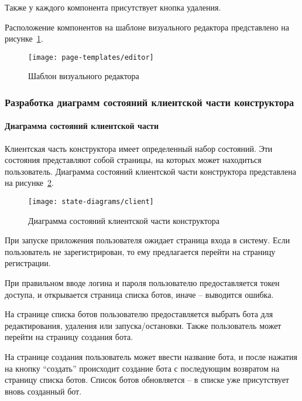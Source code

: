 Также у каждого компонента присутствует кнопка удаления.

Расположение компонентов на шаблоне визуального редактора
представлено на рисунке~\ref{f:editor-template}.

\begin{figure}[ht]
	\centering
	\vspace{\toppaddingoffigure}
	\texttt{[image: page-templates/editor]}
	\caption{Шаблон визуального редактора}
	\label{f:editor-template}
\end{figure}

\subsubsection{Разработка диаграмм состояний клиентской части конструктора}

\paragraph{Диаграмма состояний клиентской части}

Клиентская часть конструктора имеет определенный набор состояний.
Эти состояния представляют собой страницы, на которых может находиться пользователь.
Диаграмма состояний клиентской части конструктора представлена на
рисунке~\ref{f:client-state-diagram}.

\begin{figure}[ht]
	\centering
	\texttt{[image: state-diagrams/client]}
	\caption{Диаграмма состояний клиентской части конструктора}
	\label{f:client-state-diagram}
\end{figure}

При запуске приложения пользователя ожидает страница входа в
систему. Если пользователь не зарегистрирован, то ему предлагается перейти
на страницу регистрации.

При правильном вводе логина и пароля пользователю предоставляется
токен доступа, и открывается страница списка ботов, иначе – выводится
ошибка.

На странице списка ботов пользователю предоставляется выбрать бота
для редактирования, удаления или запуска/остановки. Также пользователь
может перейти на страницу создания бота.

На странице создания пользователь может ввести название бота, и после
нажатия на кнопку “создать” происходит создание бота с последующим
возвратом на страницу списка ботов. Список ботов обновляется – в списке уже
присутствует вновь созданный бот.

